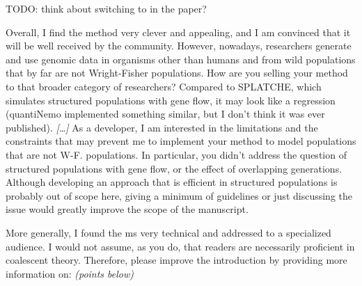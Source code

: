 TODO: think about switching to \tskit{} in the paper?


\begin{point}{}
    Overall, I find the method very clever and appealing, and I am convinced that
    it will be well received by the community. However, nowadays, researchers
    generate and use genomic data in organisms other than humans and from wild
    populations that by far are not Wright-Fisher populations. How are you selling
    your method to that broader category of researchers? Compared to SPLATCHE,
    which simulates structured populations with gene flow, it may look like a
    regression (quantiNemo implemented something similar, but I don't think it was
    ever published).
    \emph{[\ldots]}
    As a developer, I am interested in the limitations and the constraints that may
    prevent me to implement your method to model populations that are not W-F.
    populations. In particular, you didn't address the question of structured
    populations with gene flow, or the effect of overlapping generations. Although
    developing an approach that is efficient in structured populations is probably
    out of scope here, giving a minimum of guidelines or just discussing the issue
    would greatly improve the scope of the manuscript.
\end{point}



\begin{point}{}
    More generally, I found the ms very technical and addressed to a specialized
    audience. I would not assume, as you do, that readers are necessarily
    proficient in coalescent theory. Therefore, please improve the introduction by
    providing more information on: \emph{(points below)}
\end{point}

